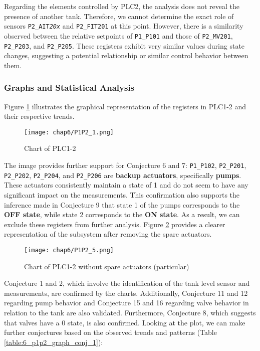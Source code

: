 \bigskip
Regarding the elements controlled by PLC2, the analysis does not reveal the presence of another tank. Therefore, we cannot determine the exact role of sensors \texttt{P2\_AIT\textit{20x}} and \texttt{P2\_FIT201} at this point.\newline
However, there is a similarity observed between the relative setpoints of \texttt{P1\_P101} and those of \texttt{P2\_MV201}, \texttt{P2\_P203}, and \texttt{P2\_P205}. These registers exhibit very similar values during state changes, suggesting a potential relationship or similar control behavior between them.

\subsubsection{Graphs and Statistical Analysis}
\label{subsubsec:6_P1P2_graphs}
Figure \ref{fig:6_P1P2_graph_full} illustrates the graphical representation of the registers in PLC1-2 and their respective trends.

\begin{figure}[ht]
	\centering
	\texttt{[image: chap6/P1P2\_1.png]}
	\caption{Chart of PLC1-2}
	\label{fig:6_P1P2_graph_full}
\end{figure}

\noindent The image provides further support for Conjecture 6 and 7: \texttt{P1\_P102}, \texttt{P2\_P201}, \texttt{P2\_P202}, \texttt{P2\_P204}, and \texttt{P2\_P206} are \textbf{backup actuators}, specifically \textbf{pumps}. These actuators consistently maintain a state of 1 and do not seem to have any significant impact on the measurements. This confirmation also supports the inference made in Conjecture 9 that state 1 of the pumps corresponds to the \textbf{OFF state}, while state 2 corresponds to the \textbf{ON state}. As a result, we can exclude these registers from further analysis.\newline 
Figure \ref{fig:6_P1P2_graph_full_nospare} provides a clearer representation of the subsystem after removing the spare actuators.

\begin{figure}[ht]
	\centering
	\texttt{[image: chap6/P1P2\_5.png]}
	\caption{Chart of PLC1-2 without spare actuators (particular)}
	\label{fig:6_P1P2_graph_full_nospare}
\end{figure}

Conjecture 1 and 2, which involve the identification of the tank level sensor and measurements, are confirmed by the charts. Additionally, Conjecture 11 and 12 regarding pump behavior and Conjecture 15 and 16 regarding valve behavior in relation to the tank are also validated. Furthermore, Conjecture 8, which suggests that valves have a 0 state, is also confirmed.\newline
Looking at the plot, we can make further conjectures based on the observed trends and patterns (Table \ref{table:6_p1p2_graph_conj_1}):

